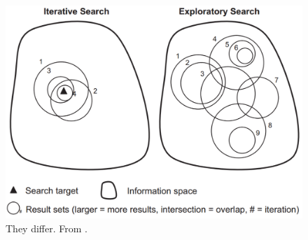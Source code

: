 \begin{figure}[htp] %
\caption{They differ. From \protect\cite{white09}.}
\label{figure_IterativeVsExploratory}
\centering
\includegraphics[scale=0.25]{figures/IterativeSearch_vs_ExploratorySearch.pdf}
\end{figure}


